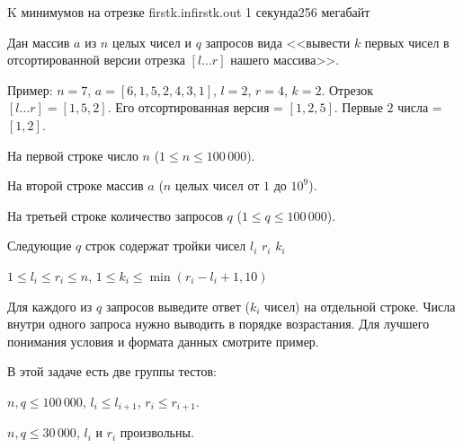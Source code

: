 
\begin{problem}{K минимумов на отрезке}
{firstk.in}{firstk.out}
{1 секунда}{256 мегабайт}{}

Дан массив $a$ из $n$ целых чисел и $q$ запросов вида
<<вывести $k$ первых чисел в отсортированной версии отрезка $[l \dots r]$ нашего массива>>.

Пример: $n = 7$, $a = [6, 1, 5, 2, 4, 3, 1]$, $l = 2$, $r = 4$, $k = 2$.
Отрезок $[l \dots r] = [1, 5, 2]$.
Его отсортированная версия = $[1, 2, 5]$.
Первые $2$ числа = $[1, 2]$.

\InputFile

На первой строке число $n$ ($1 \le n \le 100\,000$).

На второй строке массив $a$ ($n$ целых чисел от $1$ до $10^9$).

На третьей строке количество запросов $q$ ($1 \le q \le 100\,000$).

Следующие $q$ строк содержат тройки чисел $l_i$ $r_i$ $k_i$ 

$1 \le l_i \le r_i \le n$, $1 \le k_i \le \min(r_i - l_i + 1, 10)$

\OutputFile

Для каждого из $q$ запросов выведите ответ ($k_i$ чисел) на отдельной строке.
Числа внутри одного запроса нужно выводить в порядке возрастания.
Для лучшего понимания условия и формата данных смотрите пример.

\Scoring

В этой задаче есть две группы тестов:

$n, q \le 100\,000$, $l_i \le l_{i+1}$, $r_i \le r_{i+1}$.

$n, q \le 30\,000$, $l_i$ и $r_i$ произвольны.

\Example

\begin{example}
%
\end{example}

\end{problem}
